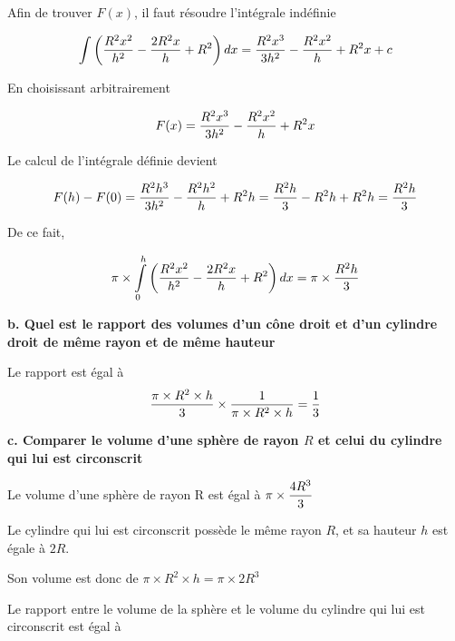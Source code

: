 \documentclass[10pt]{article}
\begin{document}
Afin de trouver $F(x)$, il faut résoudre l'intégrale indéfinie\vspace{0.2cm}

$$\int\left({R^2x^2\over{h^2}}-{2R^2x\over{h}}+R^2\right)dx={R^2x^3\over{3}h^2}-{R^2x^2\over{h}}+R^2x+c$$\vspace{0.01cm}

En choisissant arbitrairement

$$F(x)={R^2x^3\over{3}h^2}-{R^2x^2\over{h}}+R^2x$$\vspace{0.01cm}

Le calcul de l'intégrale définie devient\vspace{0.2cm}

$$F(h)-F(0)={R^2h^3\over{3}h^2}-{R^2h^2\over{h}}+R^2h={R^2h\over{3}}-R^2h+R^2h={R^2h\over{3}}$$\vspace{0.01cm}

De ce fait,

$$\pi\times\int\limits_0^h\left({R^2x^2\over{h^2}}-{2R^2x\over{h}}+R^2\right)dx=\pi\times{R^2h\over{3}}$$


\newpage
\flushleft \textbf{b. Quel est le rapport des volumes d'un cône droit et d'un cylindre droit de même rayon et de même hauteur}\vspace{0.5cm}

Le rapport est égal à $$\displaystyle{\pi \times R^2 \times h \over{3}} \times {1\over{\pi \times R^2 \times h}}={1\over{3}}$$

\flushleft \textbf{c. Comparer le volume d'une sphère de rayon $R$ et celui du cylindre qui lui est circonscrit}\vspace{0.5cm}

Le volume d'une sphère de rayon R est égal à $\displaystyle\pi\times{4R^3\over{3}}$\vspace{0.5cm}

Le cylindre qui lui est circonscrit possède le même rayon $R$, et sa hauteur $h$ est égale à $2R$.\vspace{0.5cm}

Son volume est donc de $\pi \times R^2 \times h=\pi \times 2R^3$ \vspace{0.5cm}

Le rapport entre le volume de la sphère et le volume du cylindre qui lui est circonscrit est égal à
\end{document}
